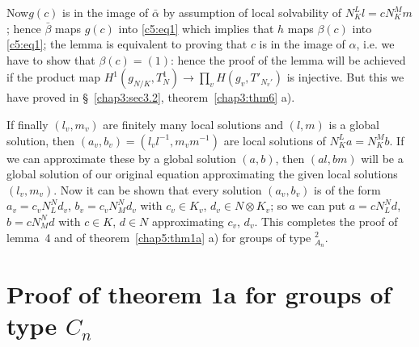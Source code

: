 Now\pageoriginale $g(c)$ is in the image of $\bar{\alpha}$ by
assumption of local 
solvability of $N_K^L l = c N^M_K m$; hence $\bar{\beta}$ maps $g(c)$
into \eqref{c5:eq1} which implies that $h$ maps $\beta(c)$ into \eqref{c5:eq1}; the
lemma is equivalent to proving that $c$ is in the image of $\alpha$,
i.e. we have to show that $\beta (c) = (1)$: hence the proof of the
lemma will be achieved if the product map $H^1 (g_{N/K}, T^1_N) \to
\prod\limits_{v}H (g_v, T'_{N_v'})$ is injective. But this we have
proved in \S~\ref{chap3:sec3.2}, theorem~\ref{chap3:thm6} a). 

If finally $(l_v, m_v)$ are finitely many local solutions and $(l, m)$
is a global solution, then $(a_v, b_v) = (l_v l^{-1}, m_vm^{-1})$ are
local solutions of $N^L_K a = N^M_K b$. If we can approximate these by
a global solution $(a, b)$, then $(al, bm)$ will be  a global solution
of our original equation approximating the given local solutions
$(l_v, m_v)$.  Now it can be shown that every solution $(a_v, b_v)$ is
of the form $a_v = c_v N^N_L d_v$, $b_v = c_vN^N_M d_v$ with $c_v \in
K_v$, $d_v \in N \otimes K_v $; so we can put $a = cN^N_L d$, $b= cN_M^N
d$ with $c \in K$, $d \in N$ approximating $c_v$, $d_v$. This completes
the proof of lemma~4 and of theorem~\ref{chap5:thm1a} a) for groups of type
${}^2_{A_n}$. 


\section{Proof of theorem 1a for groups of type
  $C_n$}\label{chap5:sec5.8} 

